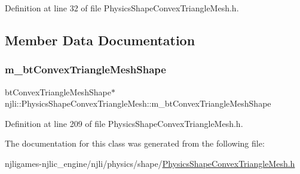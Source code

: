 Definition at line 32 of file Physics\+Shape\+Convex\+Triangle\+Mesh.\+h.



\subsection{Member Data Documentation}
\mbox{\label{classnjli_1_1_physics_shape_convex_triangle_mesh_a3ec48ca0d0ac09d99c17e13b7fb61e20}} 
\subsubsection{\texorpdfstring{m\+\_\+bt\+Convex\+Triangle\+Mesh\+Shape}{m\_btConvexTriangleMeshShape}}
{\footnotesize\ttfamily bt\+Convex\+Triangle\+Mesh\+Shape$\ast$ njli\+::\+Physics\+Shape\+Convex\+Triangle\+Mesh\+::m\+\_\+bt\+Convex\+Triangle\+Mesh\+Shape\hspace{0.3cm}{\ttfamily [private]}}



Definition at line 209 of file Physics\+Shape\+Convex\+Triangle\+Mesh.\+h.



The documentation for this class was generated from the following file\+:\begin{DoxyCompactItemize}
\item 
njligames-\/njlic\+\_\+engine/njli/physics/shape/\mbox{\hyperlink{_physics_shape_convex_triangle_mesh_8h}{Physics\+Shape\+Convex\+Triangle\+Mesh.\+h}}\end{DoxyCompactItemize}
